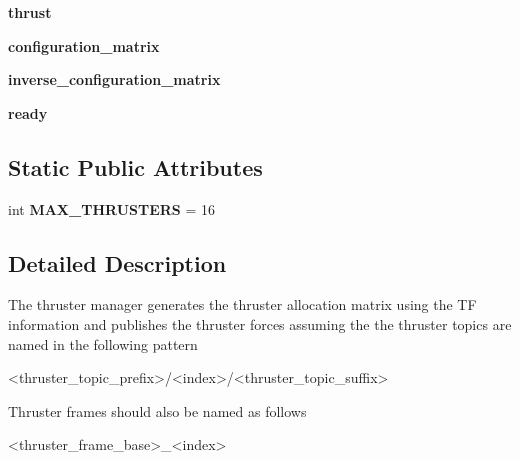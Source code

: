 \begin{DoxyCompactItemize}
\mbox{\label{classuuv__thrusters_1_1thruster__manager_1_1ThrusterManager_aea626cb654681a8c2aa38f8f505ab323}} 
{\bfseries thrust}
\item 
\mbox{\label{classuuv__thrusters_1_1thruster__manager_1_1ThrusterManager_a78b11082894fc45d5cfdb159b27b2af3}} 
{\bfseries configuration\+\_\+matrix}
\item 
\mbox{\label{classuuv__thrusters_1_1thruster__manager_1_1ThrusterManager_a93fb352d387588d109824dbcef8efcb1}} 
{\bfseries inverse\+\_\+configuration\+\_\+matrix}
\item 
\mbox{\label{classuuv__thrusters_1_1thruster__manager_1_1ThrusterManager_ac3179ee98415afd7f7dd9a78b6e2fe08}} 
{\bfseries ready}
\end{DoxyCompactItemize}
\subsection*{Static Public Attributes}
\begin{DoxyCompactItemize}
\item 
\mbox{\label{classuuv__thrusters_1_1thruster__manager_1_1ThrusterManager_a6e9b74a4007244362a11dc95bf6b0b5d}} 
int {\bfseries M\+A\+X\+\_\+\+T\+H\+R\+U\+S\+T\+E\+RS} = 16
\end{DoxyCompactItemize}


\subsection{Detailed Description}
\begin{DoxyVerb}The thruster manager generates the thruster allocation matrix using the
TF information and publishes the thruster forces assuming the the thruster
topics are named in the following pattern

<thruster_topic_prefix>/<index>/<thruster_topic_suffix>

Thruster frames should also be named as follows

<thruster_frame_base>_<index>
\end{DoxyVerb}
 

